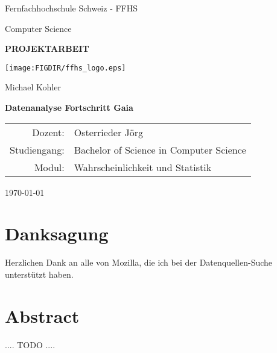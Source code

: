\pagestyle{plain}

\begin{center}

{\large Fernfachhochschule Schweiz - FFHS}

\medskip
{\large Computer Science}

\vfill
{\bfseries\Large PROJEKTARBEIT}

\vfill
\centerline{\mbox{\texttt{[image: \\FIGDIR/ffhs\_logo.eps]}}}

\vfill
\vspace{5mm}

{\LARGE Michael Kohler}

\vspace{15mm}

{\LARGE\bfseries Datenanalyse Fortschritt Gaia}

\vfill

\begin{tabular}{rl}
Dozent: & Osterrieder Jörg \\   
\noalign{\vspace{2mm}}
Studiengang: & Bachelor of Science in Computer Science\\
\noalign{\vspace{2mm}}
Modul: & Wahrscheinlichkeit und Statistik\\
\end{tabular}

\vfill
\vfill
\today

\end{center}

\newpage
\setcounter{page}{1}
\chapter*{Danksagung}
Herzlichen Dank an alle von Mozilla, die ich bei der Datenquellen-Suche unterstützt haben.


\newpage
\chapter*{Abstract}
.... TODO ....


\newpage
\openright

\pagestyle{plain}
\setcounter{page}{1}

\tableofcontents